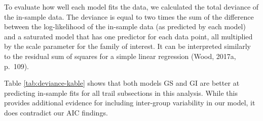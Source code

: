 \documentclass[
]{book}
\begin{document}
To evaluate how well each model fits the data, we calculated the total deviance of the in-sample data. The deviance is equal to two times the sum of the difference between the log-likelihood of the in-sample data (as predicted by each model) and a saturated model that has one predictor for each data point, all multiplied by the scale parameter for the family of interest. It can be interpreted similarly to the residual sum of squares for a simple linear regression (Wood, 2017a, p.~109).

Table \ref{tab:deviance-kable} shows that both models GS and GI are better at predicting in-sample fits for all trail subsections in this analysis. While this provides additional evidence for including inter-group variability in our model, it does contradict our AIC findings.

\begin{table}


\end{table}
\end{document}
